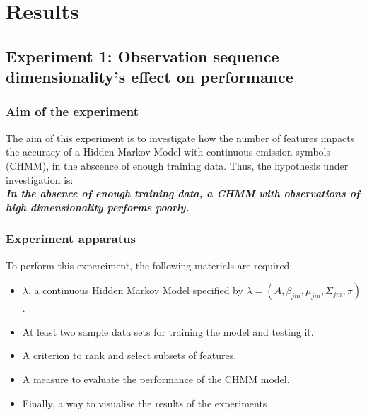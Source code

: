\chapter{Results} \label{sec:results}

\section{Experiment 1: Observation sequence dimensionality's effect on performance} \label{exp:feat-size}

\subsection{Aim of the experiment}
The aim of this experiment is to investigate how the number of features impacts the accuracy of a Hidden Markov Model with continuous emission symbols (CHMM), in the abscence of enough training data. Thus, the hypothesis under investigation is:\\
\textbf{\textit{In the absence of enough training data, a CHMM with observations of high dimensionality performs poorly.}}

\subsection{Experiment apparatus}
To perform this expereiment, the following materials are required:
\begin{itemize}
	\item \(\lambda\), a continuous Hidden Markov Model specified by \(\lambda = (A, \beta_{jm}, \mu_{jm}, \Sigma_{jm}, \pi)\).
	\item At least two sample data sets for training the model and testing it.
	\item A criterion to rank and select subsets of features.
	\item A measure to evaluate the performance of the CHMM model.
	\item Finally, a way to visualise the results of the experiments
\end{itemize}

